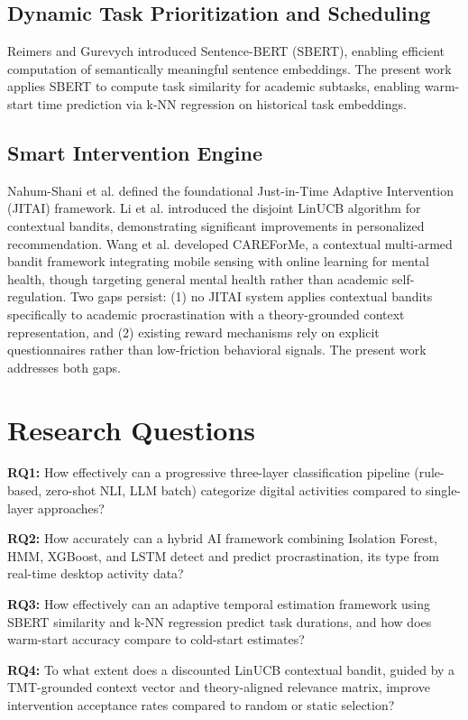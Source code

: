 \documentclass[conference]{IEEEtran}
\begin{document}
\subsection{Dynamic Task Prioritization and Scheduling}
Reimers and Gurevych \cite{b7} introduced Sentence-BERT (SBERT), enabling efficient computation of semantically meaningful sentence embeddings. The present work applies SBERT to compute task similarity for academic subtasks, enabling warm-start time prediction via k-NN regression on historical task embeddings.

\subsection{Smart Intervention Engine}
Nahum-Shani et al. \cite{b14} defined the foundational Just-in-Time Adaptive Intervention (JITAI) framework. Li et al. \cite{b9} introduced the disjoint LinUCB algorithm for contextual bandits, demonstrating significant improvements in personalized recommendation. Wang et al. \cite{b15} developed CAREForMe, a contextual multi-armed bandit framework integrating mobile sensing with online learning for mental health, though targeting general mental health rather than academic self-regulation. Two gaps persist: (1) no JITAI system applies contextual bandits specifically to academic procrastination with a theory-grounded context representation, and (2) existing reward mechanisms rely on explicit questionnaires rather than low-friction behavioral signals. The present work addresses both gaps.

\section{Research Questions}

\textbf{RQ1:} How effectively can a progressive three-layer classification pipeline (rule-based, zero-shot NLI, LLM batch) categorize digital activities compared to single-layer approaches?

\textbf{RQ2:} How accurately can a hybrid AI framework combining Isolation Forest, HMM, XGBoost, and LSTM detect and predict procrastination, its type from real-time desktop activity data?

\textbf{RQ3:} How effectively can an adaptive temporal estimation framework using SBERT similarity and k-NN regression predict task durations, and how does warm-start accuracy compare to cold-start estimates?

\textbf{RQ4:} To what extent does a discounted LinUCB contextual bandit, guided by a TMT-grounded context vector and theory-aligned relevance matrix, improve intervention acceptance rates compared to random or static selection?
\end{document}
